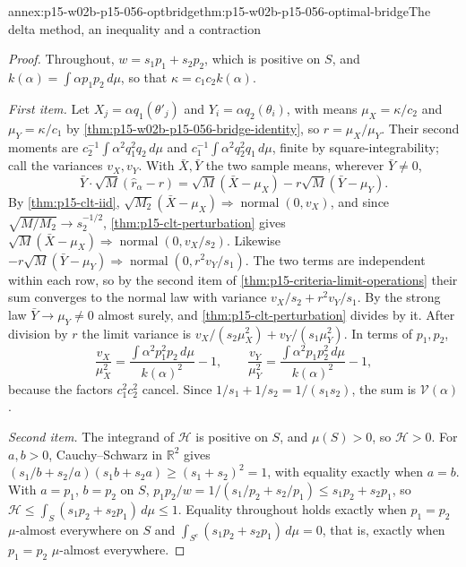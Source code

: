 \begin{annexitem}{annex:p15-w02b-p15-056-optbridge}{thm:p15-w02b-p15-056-optimal-bridge}{The delta method, an inequality and a contraction}
\begin{proof}
Throughout, \(w=s_1p_1+s_2p_2\), which is positive on \(S\), and
\(k(\alpha)=\int\alpha p_1p_2\,d\mu\), so that
\(\kappa=c_1c_2k(\alpha)\).

\emph{First item.} Let \(X_j=\alpha q_1(\theta'_j)\) and
\(Y_i=\alpha q_2(\theta_i)\), with means \(\mu_X=\kappa/c_2\) and
\(\mu_Y=\kappa/c_1\) by \cref{thm:p15-w02b-p15-056-bridge-identity}, so
\(r=\mu_X/\mu_Y\). Their second moments are
\(c_2^{-1}\int\alpha^2q_1^2q_2\,d\mu\) and
\(c_1^{-1}\int\alpha^2q_2^2q_1\,d\mu\), finite by square-integrability;
call the variances \(v_X,v_Y\). With \(\bar X,\bar Y\) the two sample
means, wherever \(\bar Y\neq0\),
\[
 \bar Y\cdot\sqrt M(\widehat r_\alpha-r)
 =\sqrt M(\bar X-\mu_X)-r\sqrt M(\bar Y-\mu_Y) .
\]
By \cref{thm:p15-clt-iid}, \(\sqrt{M_2}(\bar X-\mu_X)\Rightarrow
\operatorname{normal}(0,v_X)\), and since \(\sqrt{M/M_2}\to s_2^{-1/2}\),
\cref{thm:p15-clt-perturbation} gives
\(\sqrt M(\bar X-\mu_X)\Rightarrow\operatorname{normal}(0,v_X/s_2)\).
Likewise \(-r\sqrt M(\bar Y-\mu_Y)\Rightarrow
\operatorname{normal}(0,r^2v_Y/s_1)\). The two terms are independent
within each row, so by the second item of
\cref{thm:p15-criteria-limit-operations} their sum converges to the
normal law with variance \(v_X/s_2+r^2v_Y/s_1\). By the strong law
\(\bar Y\to\mu_Y\neq0\) almost surely, and
\cref{thm:p15-clt-perturbation} divides by it. After division by \(r\)
the limit variance is \(v_X/(s_2\mu_X^2)+v_Y/(s_1\mu_Y^2)\). In terms of
\(p_1,p_2\),
\[
 \frac{v_X}{\mu_X^2}=\frac{\int\alpha^2p_1^2p_2\,d\mu}{k(\alpha)^2}-1,
 \qquad
 \frac{v_Y}{\mu_Y^2}=\frac{\int\alpha^2p_1p_2^2\,d\mu}{k(\alpha)^2}-1,
\]
because the factors \(c_1^2c_2^2\) cancel. Since
\(1/s_1+1/s_2=1/(s_1s_2)\), the sum is \(\mathcal V(\alpha)\).

\emph{Second item.} The integrand of \(\mathcal H\) is positive on \(S\),
and \(\mu(S)>0\), so \(\mathcal H>0\). For \(a,b>0\), Cauchy--Schwarz in
\(\mathbb R^2\) gives \((s_1/b+s_2/a)(s_1b+s_2a)\geq(s_1+s_2)^2=1\), with
equality exactly when \(a=b\). With \(a=p_1\), \(b=p_2\) on \(S\),
\(p_1p_2/w=1/(s_1/p_2+s_2/p_1)\leq s_1p_2+s_2p_1\), so
\(\mathcal H\leq\int_S(s_1p_2+s_2p_1)\,d\mu\leq1\). Equality throughout
holds exactly when \(p_1=p_2\) \(\mu\)-almost everywhere on \(S\) and
\(\int_{S^c}(s_1p_2+s_2p_1)\,d\mu=0\), that is, exactly when
\(p_1=p_2\) \(\mu\)-almost everywhere.


\end{proof}
\end{annexitem}
